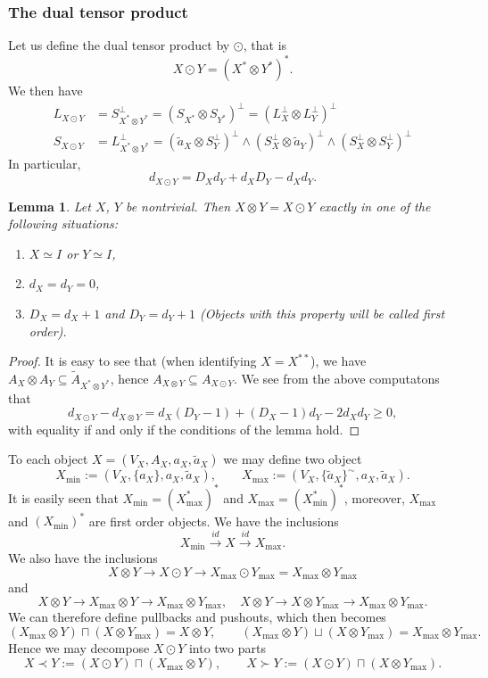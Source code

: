 \documentclass[12pt]{article}
\newtheorem{lemma}{Lemma}
\theoremstyle{definition}
\theoremstyle{remark}
\begin{document}
\subsubsection{The dual tensor product}

Let us define the dual tensor product by $\odot$, that is
\[
X\odot Y=(X^*\otimes Y^*)^*.
\]
We then have
\begin{align*}
L_{X\odot Y}&=S^\perp_{X^*\otimes Y^*}=(S_{X^*}\otimes S_{Y^*})^\perp=(L_X^\perp\otimes
L_Y^\perp)^\perp\\
S_{X\odot Y}&= L_{X^*\otimes Y^*}^\perp=(\tilde a_X\otimes
S_Y^\perp)^\perp\wedge(S_X^\perp\otimes \tilde a_Y)^\perp\wedge (S_X^\perp\otimes
S_Y^\perp)^\perp
\end{align*}
In particular,
\[
d_{X\odot Y}=D_Xd_Y+d_XD_Y-d_Xd_Y.
\]
\begin{lemma}\label{lemma:tensors} Let $X$, $Y$ be nontrivial. Then $X\otimes Y=X\odot Y$
exactly in one of the following situations:
\begin{enumerate}
\item $X\simeq I$ or $Y\simeq I$,
\item $d_X=d_Y=0$,
\item $D_X=d_X+1$ and $D_Y=d_Y+1$ (Objects with this property will be called
first order).
\end{enumerate}

\end{lemma}

\begin{proof} It is easy to see that (when identifying $X=X^{**}$), we have $A_X\otimes
A_Y\subseteq \tilde A_{X^*\otimes  Y^*}$, hence $A_{X\otimes Y}\subseteq A_{X\odot Y}$. We see from the above computatons that
\[
d_{X\odot Y}-d_{X\otimes Y}=d_X(D_Y-1)+(D_X-1)d_Y-2d_Xd_Y\ge 0,
\]
with equality if and only if the conditions of the lemma hold.

\end{proof}



To each object $X=(V_X,A_X,a_X,\tilde a_X)$ we may define two object
\[
X_{\min}:=(V_X,\{a_X\},a_X,\tilde a_X),\qquad X_{\max}:=(V_X,\{\tilde a_X\}^\sim,a_X,\tilde a_X). 
\]
It is easily seen that $X_{\min}=(X^*_{\max})^*$ and $X_{\max}=(X^*_{\min})^*$, moreover,
$X_{\max}$ and $(X_{\min})^*$ are first order objects. We have the inclusions
\[
X_{\min}\xrightarrow{id} X\xrightarrow{id} X_{\max}.
\]
We also have the inclusions
\[
X\otimes Y\to X\odot Y \to X_{\max}\odot Y_{\max}=X_{\max}\otimes Y_{\max}
\]
and
\[
X\otimes Y \to X_{\max}\otimes Y\to X_{\max}\otimes Y_{\max}, \quad X\otimes Y \to X\otimes Y_{\max}\to X_{\max}\otimes Y_{\max}.
\]
We can therefore define pullbacks and pushouts,  which then becomes
\[
(X_{\max}\otimes Y)\sqcap (X\otimes Y_{\max})=X\otimes Y,\qquad (X_{\max}\otimes Y)\sqcup
(X\otimes Y_{\max})=X_{\max}\otimes Y_{\max}.
\]
Hence we may decompose $X\odot Y$ into two parts
\[
X\prec Y:= (X\odot Y)\sqcap (X_{\max}\otimes Y),\qquad X\succ Y:=(X\odot Y) \sqcap
(X\otimes  Y_{\max}).
\]
\end{document}
